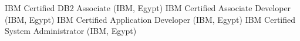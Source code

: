 %
%
%


\begin{scholarship}
	 {IBM Certified DB2 Associate (IBM, Egypt)}
	 {IBM Certified Associate Developer (IBM, Egypt)}
	 {IBM Certified Application Developer (IBM, Egypt)}
	 {IBM Certified System Administrator (IBM, Egypt)}
\end{scholarship}